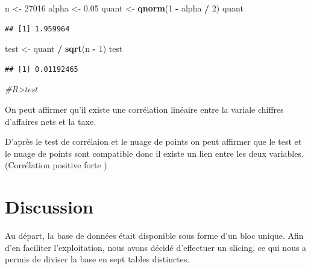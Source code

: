 \documentclass[mstat,12pt]{unswthesis}
\newenvironment{Shaded}{\begin{snugshade}}{\end{snugshade}}
\newcommand{\CommentTok}[1]{\textcolor[rgb]{0.56,0.35,0.01}{\textit{#1}}}
\newcommand{\DecValTok}[1]{\textcolor[rgb]{0.00,0.00,0.81}{#1}}
\newcommand{\FloatTok}[1]{\textcolor[rgb]{0.00,0.00,0.81}{#1}}
\newcommand{\FunctionTok}[1]{\textcolor[rgb]{0.13,0.29,0.53}{\textbf{#1}}}
\newcommand{\NormalTok}[1]{#1}
\newcommand{\OtherTok}[1]{\textcolor[rgb]{0.56,0.35,0.01}{#1}}
\newcommand{\SpecialCharTok}[1]{\textcolor[rgb]{0.81,0.36,0.00}{\textbf{#1}}}
\begin{document}
\medskip

\begin{Shaded}
\begin{Highlighting}[]
\NormalTok{n }\OtherTok{\textless{}{-}} \DecValTok{27016}
\NormalTok{alpha }\OtherTok{\textless{}{-}} \FloatTok{0.05}
\NormalTok{quant }\OtherTok{\textless{}{-}} \FunctionTok{qnorm}\NormalTok{(}\DecValTok{1} \SpecialCharTok{{-}}\NormalTok{ alpha }\SpecialCharTok{/} \DecValTok{2}\NormalTok{)}
\NormalTok{quant}
\end{Highlighting}
\end{Shaded}

\begin{verbatim}
## [1] 1.959964
\end{verbatim}

\begin{Shaded}
\begin{Highlighting}[]
\NormalTok{test }\OtherTok{\textless{}{-}}\NormalTok{ quant }\SpecialCharTok{/} \FunctionTok{sqrt}\NormalTok{(n }\SpecialCharTok{{-}} \DecValTok{1}\NormalTok{)}
\NormalTok{test}
\end{Highlighting}
\end{Shaded}

\begin{verbatim}
## [1] 0.01192465
\end{verbatim}

\begin{Shaded}
\begin{Highlighting}[]
\CommentTok{\#R\textgreater{}test}
\end{Highlighting}
\end{Shaded}

\medskip

On peut affirmer qu'il existe une corrélation linéaire entre la variale
chiffres d'affaires nets et la taxe.

D'après le test de corrélaion et le nuage de points on peut affirmer que
le test et le nuage de points sont compatible donc il existe un lien
entre les deux variables.(Corrélation positive forte )

\chapter{Discussion}\label{discussion}

Au départ, la base de données était disponible sous forme d'un bloc
unique. Afin d'en faciliter l'exploitation, nous avons décidé
d'effectuer un slicing, ce qui nous a permis de diviser la base en sept
tables distinctes.
\end{document}
